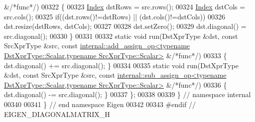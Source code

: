 \begin{DoxyCode}
       &\textcolor{comment}{/*func*/})
00322   \{
00323     \hyperlink{namespace_eigen_a62e77e0933482dafde8fe197d9a2cfde}{Index} dstRows = src.rows();
00324     \hyperlink{namespace_eigen_a62e77e0933482dafde8fe197d9a2cfde}{Index} dstCols = src.cols();
00325     \textcolor{keywordflow}{if}((dst.rows()!=dstRows) || (dst.cols()!=dstCols))
00326       dst.resize(dstRows, dstCols);
00327     
00328     dst.setZero();
00329     dst.diagonal() = src.diagonal();
00330   \}
00331   
00332   \textcolor{keyword}{static} \textcolor{keywordtype}{void} run(DstXprType &dst, \textcolor{keyword}{const} SrcXprType &src, \textcolor{keyword}{const} 
      \hyperlink{struct_eigen_1_1internal_1_1add__assign__op}{internal::add\_assign\_op<typename DstXprType::Scalar,typename SrcXprType::Scalar>}
       &\textcolor{comment}{/*func*/})
00333   \{ dst.diagonal() += src.diagonal(); \}
00334   
00335   \textcolor{keyword}{static} \textcolor{keywordtype}{void} run(DstXprType &dst, \textcolor{keyword}{const} SrcXprType &src, \textcolor{keyword}{const} 
      \hyperlink{struct_eigen_1_1internal_1_1sub__assign__op}{internal::sub\_assign\_op<typename DstXprType::Scalar,typename SrcXprType::Scalar>}
       &\textcolor{comment}{/*func*/})
00336   \{ dst.diagonal() -= src.diagonal(); \}
00337 \};
00338 
00339 \} \textcolor{comment}{// namespace internal}
00340 
00341 \} \textcolor{comment}{// end namespace Eigen}
00342 
00343 \textcolor{preprocessor}{#endif // EIGEN\_DIAGONALMATRIX\_H}
\end{DoxyCode}
